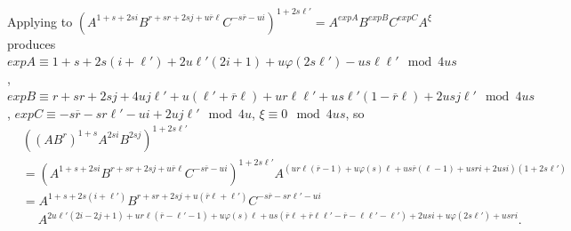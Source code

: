 \documentclass{amsart}
\theoremstyle{definition}
\theoremstyle{remark}
\begin{document}
Applying \cite[Theorem 3.5]{MS3} to $(A^{1 + s + 2si} B^{r + sr + 2sj + u\overline{r}\ell} C^{-s\overline{r} - ui})^{1 + 2s\ell'} = A^{expA} B^{expB} C^{expC} A^{\xi}$ produces $expA\equiv 1 + s + 2s(i + \ell') + 2u\ell'(2i + 1) + u\varphi(2s\ell') - us\ell \ell'\mod 4us$, $expB\equiv r + sr + 2sj + 4uj\ell' + u(\ell' + \overline{r}\ell) + ur\ell \ell' + us\ell'(1 - \overline{r}\ell) + 2usj\ell'\mod 4us$, $expC\equiv - s\overline{r} - sr\ell' - ui + 2uj\ell'\mod 4u$, $\xi\equiv 0\mod 4us$, so
\begin{equation}\label{eq.R.1}
    \begin{split}
        &((AB^r)^{1+s} A^{2si} B^{2sj})^{1 + 2s\ell'}\\
        &= (A^{1 + s + 2si} B^{r + sr + 2sj + u\overline{r}\ell} C^{-s\overline{r} - ui})^{1 + 2s\ell'} A^{(ur\ell(\overline{r} - 1) + u\varphi(s)\ell + us\overline{r}(\ell - 1) + usri + 2usi)(1 + 2s\ell')}\\
        &= A^{1 + s + 2s(i + \ell')} B^{r + sr + 2sj + u(\overline{r}\ell + \ell')} C^{-s\overline{r} - sr\ell' - ui}\\
        &\quad\; A^{2u\ell'(2i - 2j + 1) + ur\ell(\overline{r} - \ell' - 1) + u\varphi(s)\ell + us(\overline{r}\ell + \overline{r}\ell \ell' - \overline{r} - \ell \ell' - \ell') + 2usi + u\varphi(2s\ell') + usri}.
    \end{split}
\end{equation}
\end{document}
